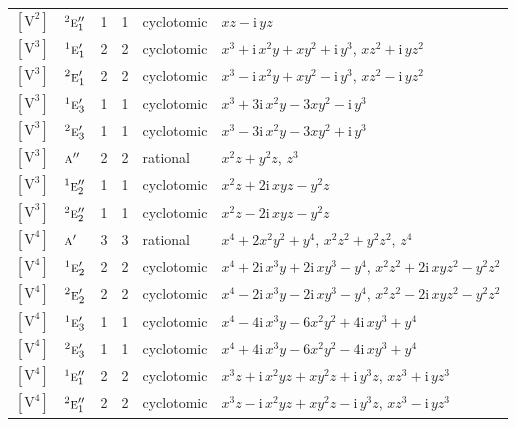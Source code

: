 \documentclass[10pt,a4paper]{article}
\numberwithin{equation}{section}
\newcommand{\irr}[1]{\text{\normalfont\scshape #1}}
\newcommand{\conjpair}[1]{{}^{#1}}
\newcommand{\iunit}{\mathrm{i}}
\newcommand{\jahn}[1]{\mathrm{#1}}
\newlength{\fillwidth}\newlength{\cellwidth}\newlength{\colwidth}
\begin{document}
{\begin{longtable}{@{}llrrl>{\RaggedRight\arraybackslash}p{\fillwidth}@{}}
$\jahn{[V^{2}]}$ & $\conjpair{2}\irr{e}_{1}''$ & 1 & 1 & cyclotomic & $xz - \iunit{}\,yz$\\
$\jahn{[V^{3}]}$ & $\conjpair{1}\irr{e}_{1}'$ & 2 & 2 & cyclotomic & $x^{3} + \iunit{}\,x^{2}y + xy^{2} + \iunit{}\,y^{3}$, $xz^{2} + \iunit{}\,yz^{2}$\\
$\jahn{[V^{3}]}$ & $\conjpair{2}\irr{e}_{1}'$ & 2 & 2 & cyclotomic & $x^{3} - \iunit{}\,x^{2}y + xy^{2} - \iunit{}\,y^{3}$, $xz^{2} - \iunit{}\,yz^{2}$\\
$\jahn{[V^{3}]}$ & $\conjpair{1}\irr{e}_{3}'$ & 1 & 1 & cyclotomic & $x^{3} + 3\iunit{}\,x^{2}y - 3xy^{2} - \iunit{}\,y^{3}$\\
$\jahn{[V^{3}]}$ & $\conjpair{2}\irr{e}_{3}'$ & 1 & 1 & cyclotomic & $x^{3} - 3\iunit{}\,x^{2}y - 3xy^{2} + \iunit{}\,y^{3}$\\
$\jahn{[V^{3}]}$ & $\irr{a}''$ & 2 & 2 & rational & $x^{2}z + y^{2}z$, $z^{3}$\\
$\jahn{[V^{3}]}$ & $\conjpair{1}\irr{e}_{2}''$ & 1 & 1 & cyclotomic & $x^{2}z + 2\iunit{}\,xyz - y^{2}z$\\
$\jahn{[V^{3}]}$ & $\conjpair{2}\irr{e}_{2}''$ & 1 & 1 & cyclotomic & $x^{2}z - 2\iunit{}\,xyz - y^{2}z$\\
$\jahn{[V^{4}]}$ & $\irr{a}'$ & 3 & 3 & rational & $x^{4} + 2x^{2}y^{2} + y^{4}$, $x^{2}z^{2} + y^{2}z^{2}$, $z^{4}$\\
$\jahn{[V^{4}]}$ & $\conjpair{1}\irr{e}_{2}'$ & 2 & 2 & cyclotomic & $x^{4} + 2\iunit{}\,x^{3}y + 2\iunit{}\,xy^{3} - y^{4}$, $x^{2}z^{2} + 2\iunit{}\,xyz^{2} - y^{2}z^{2}$\\
$\jahn{[V^{4}]}$ & $\conjpair{2}\irr{e}_{2}'$ & 2 & 2 & cyclotomic & $x^{4} - 2\iunit{}\,x^{3}y - 2\iunit{}\,xy^{3} - y^{4}$, $x^{2}z^{2} - 2\iunit{}\,xyz^{2} - y^{2}z^{2}$\\
$\jahn{[V^{4}]}$ & $\conjpair{1}\irr{e}_{3}'$ & 1 & 1 & cyclotomic & $x^{4} - 4\iunit{}\,x^{3}y - 6x^{2}y^{2} + 4\iunit{}\,xy^{3} + y^{4}$\\
$\jahn{[V^{4}]}$ & $\conjpair{2}\irr{e}_{3}'$ & 1 & 1 & cyclotomic & $x^{4} + 4\iunit{}\,x^{3}y - 6x^{2}y^{2} - 4\iunit{}\,xy^{3} + y^{4}$\\
$\jahn{[V^{4}]}$ & $\conjpair{1}\irr{e}_{1}''$ & 2 & 2 & cyclotomic & $x^{3}z + \iunit{}\,x^{2}yz + xy^{2}z + \iunit{}\,y^{3}z$, $xz^{3} + \iunit{}\,yz^{3}$\\
$\jahn{[V^{4}]}$ & $\conjpair{2}\irr{e}_{1}''$ & 2 & 2 & cyclotomic & $x^{3}z - \iunit{}\,x^{2}yz + xy^{2}z - \iunit{}\,y^{3}z$, $xz^{3} - \iunit{}\,yz^{3}$\\

\end{longtable}}
\end{document}
